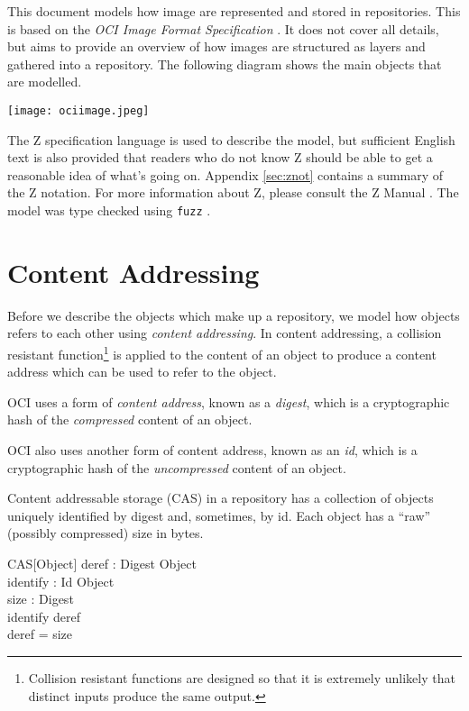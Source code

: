 \documentclass[a4paper,twoside,12pt]{article}
\begin{document}
This document models how image are represented and stored in repositories. This is based on the \textit{OCI Image Format Specification} \cite{ociimage}. It does not cover all details, but aims to provide an overview of how images are structured as layers and gathered into a repository. The following diagram shows the main objects that are modelled.

\texttt{[image: ociimage.jpeg]}

The Z specification language is used to describe the model, but sufficient English text is also provided that readers who do not know Z should be able to get a reasonable idea of what's going on. Appendix \ref{sec:znot} contains a summary of the Z notation.
For more information about Z, please consult the Z Manual \cite{zman}.
The model was type checked using \texttt{fuzz} \cite{fuzz}.

\newpage
\section{Content Addressing}

Before we describe the objects which make up a repository, we model how objects refers to each other using \textit{content addressing}.
In content addressing, a collision resistant function\footnote{Collision resistant functions are designed so that it is extremely unlikely that distinct inputs produce the same output.} is applied to the content of an object to produce a content address which can be used to refer to the object.

OCI uses a form of \textit{content address}, known as a \textit{digest}, which is a cryptographic hash of the \textit{compressed} content of an object.
\begin{zed}
[ Digest ] 
\end{zed}

OCI also uses another form of content address, known as an \textit{id}, which is a cryptographic hash of the \textit{uncompressed} content of an object.
\begin{zed}
[ Id ] 
\end{zed}

Content addressable storage (CAS) in a repository has a collection of objects uniquely identified by digest and, sometimes, by id. Each object has a ``raw'' (possibly compressed) size in bytes.
\begin{schema}{CAS}[Object]
  deref : Digest \pinj Object \\
  identify : Id \pinj Object \\
  size : Digest \pfun \nat \\
\where
  \ran identify \subseteq \ran deref \\
  \dom deref = \dom size \\
\end{schema}
\end{document}
